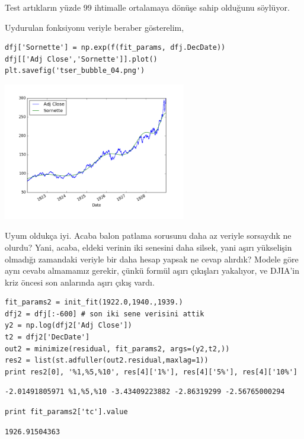 \documentclass[12pt,fleqn]{article}\usepackage{../../common}
\begin{document}
Test artıkların yüzde 99 ihtimalle ortalamaya dönüşe sahip olduğunu
söylüyor. 

Uydurulan fonksiyonu veriyle beraber gösterelim,

\begin{verbatim}
dfj['Sornette'] = np.exp(f(fit_params, dfj.DecDate))
dfj[['Adj Close','Sornette']].plot()
plt.savefig('tser_bubble_04.png')
\end{verbatim}

\includegraphics[height=6cm]{tser_bubble_04.png}

Uyum oldukça iyi. Acaba balon patlama sorusunu daha az veriyle sorsaydık ne
olurdu? Yani, acaba, eldeki verinin iki senesini daha silsek, yani aşırı
yükselişin olmadığı zamandaki veriyle bir daha hesap yapsak ne cevap
alırdık? Modele göre aynı cevabı almamamız gerekir, çünkü formül aşırı
çıkışları yakalıyor, ve DJIA'in kriz öncesi son anlarında aşırı çıkış
vardı.

\begin{verbatim}
fit_params2 = init_fit(1922.0,1940.,1939.)
dfj2 = dfj[:-600] # son iki sene verisini attik
y2 = np.log(dfj2['Adj Close'])
t2 = dfj2['DecDate']
out2 = minimize(residual, fit_params2, args=(y2,t2,))
res2 = list(st.adfuller(out2.residual,maxlag=1))
print res2[0], '%1,%5,%10', res[4]['1%'], res[4]['5%'], res[4]['10%']
\end{verbatim}

\begin{verbatim}
-2.01491805971 %1,%5,%10 -3.43409223882 -2.86319299 -2.56765000294
\end{verbatim}

\begin{verbatim}
print fit_params2['tc'].value 
\end{verbatim}

\begin{verbatim}
1926.91504363
\end{verbatim}
\end{document}

